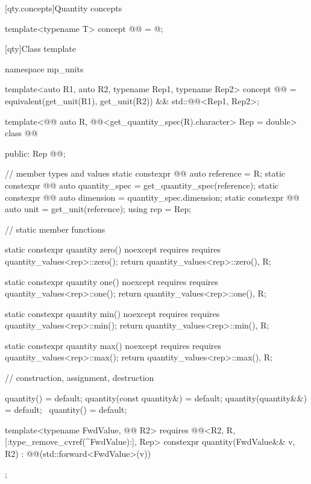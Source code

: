 [qty.concepts]{Quantity concepts}

\begin{itemdecl}
template<typename T>
concept @@ = @\unspecnc@;
\end{itemdecl}

[qty]{Class template }

\begin{codeblock}
namespace mp_units {

template<auto R1, auto R2, typename Rep1, typename Rep2>
concept @@ =
  equivalent(get_unit(R1), get_unit(R2)) && std::@@<Rep1, Rep2>;

template<@@ auto R, @@<get_quantity_spec(R).character> Rep = double>
class @@ {
public:
  Rep @@;

  // member types and values
  static constexpr @@ auto reference = R;
  static constexpr @@ auto quantity_spec = get_quantity_spec(reference);
  static constexpr @@ auto dimension = quantity_spec.dimension;
  static constexpr @@ auto unit = get_unit(reference);
  using rep = Rep;

  // static member functions

  static constexpr quantity zero() noexcept
    requires requires { quantity_values<rep>::zero(); }
  {
    return {quantity_values<rep>::zero(), R};
  }

  static constexpr quantity one() noexcept
    requires requires { quantity_values<rep>::one(); }
  {
    return {quantity_values<rep>::one(), R};
  }

  static constexpr quantity min() noexcept
    requires requires { quantity_values<rep>::min(); }
  {
    return {quantity_values<rep>::min(), R};
  }

  static constexpr quantity max() noexcept
    requires requires { quantity_values<rep>::max(); }
  {
    return {quantity_values<rep>::max(), R};
  }

  // construction, assignment, destruction

  quantity() = default;
  quantity(const quantity&) = default;
  quantity(quantity&&) = default;
  ~quantity() = default;

  template<typename FwdValue, @@ R2>
    requires @@<R2{}, R, [:type_remove_cvref(^FwdValue):], Rep>
  constexpr quantity(FwdValue&& v, R2) : @@(std::forward<FwdValue>(v))
  {
  }
};

}
\end{codeblock}

